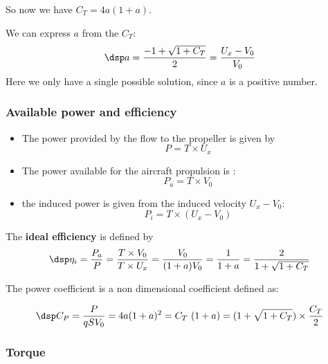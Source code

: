 

So now we have $C_T = 4 a (1+ a)$.

We can   express $a$ from the $C_T$:
$$ \dsp
a = \frac{-1+\sqrt{1+C_T}}{2} = \dfrac{U_x-V_0}{V_0}
$$
Here we only have a single possible solution, since $a$ is a positive number.


\subsubsection{\sc Available power and efficiency}

\begin{itemize}
\item The power provided by the flow to the propeller is given by
$$
P = T \times U_x
$$
\item The power available for the aircraft propulsion is :
$$ 
P_a = T \times V_0 
$$
\item the induced power is given from the induced velocity $U_x - V_0$:
$$ P_i = T \times (U_x - V_0) $$
\end{itemize}


The \textbf{ideal efficiency} is defined by
$$\dsp
\eta_i = \frac{P_a}{P} = \frac{T \times V_0}{T \times U_x} = \frac{V_0}{(1+a) V_0} = \frac{1}{1+a}
= \frac{2}{1+\sqrt{1+C_T}}
$$


The power coefficient is a non dimensional coefficient defined as:

\begin{equation} \dsp 
  C_P = \frac{P}{q S V_0} = 4 a (1+ a)^2 = C_T~(1+a) = (1+\sqrt{1+C_T}) \times \frac{C_T}{2}
  \label{eq:Pa_0_prop}
\end{equation}




\subsubsection{\sc Torque }

